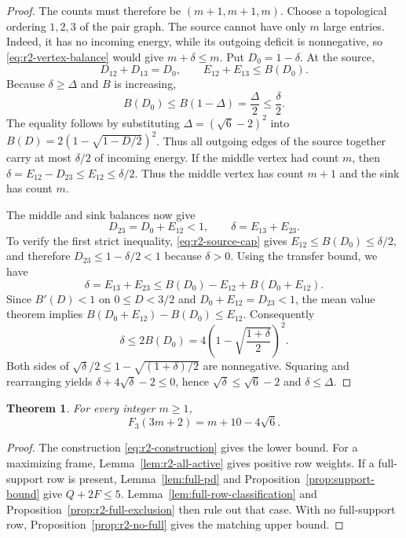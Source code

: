 \documentclass[11pt]{article}
\numberwithin{equation}{section}
\newtheorem{theorem}{Theorem}[section]
\theoremstyle{definition}
\theoremstyle{definition}
\newcommand{\F}{F_3}
\begin{document}
\begin{proof}
The counts must therefore be $(m+1,m+1,m)$.
Choose a topological ordering $1,2,3$ of the pair graph.
The source cannot have only $m$ large entries. Indeed, it has
no incoming energy, while its outgoing deficit is nonnegative,
so \eqref{eq:r2-vertex-balance} would give $m+\delta\le m$. Put $D_0=1-\delta$.
At the source,
\[
 D_{12}+D_{13}=D_0,\qquad
 E_{12}+E_{13}\le B(D_0).
\]
Because $\delta\ge\Delta$ and $B$ is increasing,
\begin{equation}
 B(D_0)\le B(1-\Delta)=\frac\Delta2\le\frac\delta2.
 \label{eq:r2-source-cap}
\end{equation}
The equality follows by substituting
$\Delta=(\sqrt6-2)^2$ into
$B(D)=2(1-\sqrt{1-D/2})^2$.  Thus all outgoing edges of
the source together carry at most $\delta/2$ of incoming energy.
If the middle vertex had count $m$, then
$\delta=E_{12}-D_{23}\le E_{12}\le\delta/2$.
Thus the middle vertex has count $m+1$ and the sink has
count $m$.

The middle and sink balances now give
\[
 D_{23}=D_0+E_{12}<1,
 \qquad \delta=E_{13}+E_{23}.
\]
To verify the first strict inequality,
\eqref{eq:r2-source-cap} gives
$E_{12}\le B(D_0)\le\delta/2$, and therefore
$D_{23}\le1-\delta/2<1$ because $\delta>0$.
Using the transfer bound, we have
\[
 \delta=E_{13}+E_{23}
 \le B(D_0)-E_{12}+B(D_0+E_{12}).
\]
Since $B'(D)<1$ on $0\le D<3/2$ and
$D_0+E_{12}=D_{23}<1$, the mean value theorem implies
$B(D_0+E_{12})-B(D_0)\le E_{12}$.  Consequently
\[
 \delta\le2B(D_0)
 =4\left(1-\sqrt{\frac{1+\delta}{2}}\right)^2.
\]
Both sides of
$\sqrt\delta/2\le1-\sqrt{(1+\delta)/2}$ are nonnegative.
Squaring and rearranging yields
$\delta+4\sqrt\delta-2\le0$, hence
$\sqrt\delta\le\sqrt6-2$ and $\delta\le\Delta$.
\end{proof}

\begin{theorem}\label{thm:r2-sharp}
For every integer $m\ge1$,
\[
 \F(3m+2)=m+10-4\sqrt6.
\]
\end{theorem}

\begin{proof}
The construction \eqref{eq:r2-construction} gives the lower
bound. For a maximizing frame, Lemma~\ref{lem:r2-all-active}
gives positive row weights. If a full-support row is present,
Lemma~\ref{lem:full-pd} and Proposition~\ref{prop:support-bound}
give $Q+2F\le5$. Lemma~\ref{lem:full-row-classification} and
Proposition~\ref{prop:r2-full-exclusion} then rule out that case.
With no full-support row, Proposition~\ref{prop:r2-no-full}
gives the matching upper bound.
\end{proof}
\end{document}
